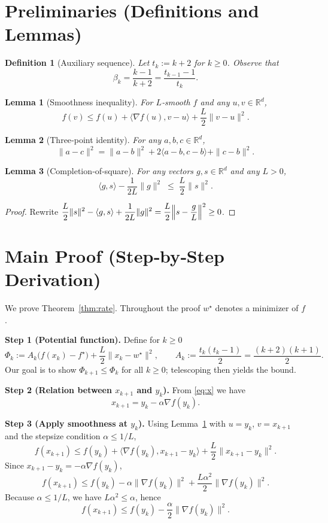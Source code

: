 \documentclass{article}
\newtheorem{lemma}{Lemma}
\newtheorem{definition}{Definition}
\newcommand{\grad}{\nabla}
\newcommand{\R}{\mathbb{R}}
\begin{document}
\section*{Preliminaries (Definitions and Lemmas)}
\begin{definition}[Auxiliary sequence]\label{def:tk}
Let $t_k:=k+2$ for $k\ge0$. Observe that
\[
\beta_k=\frac{k-1}{k+2}= \frac{t_{k-1}-1}{t_k}.
\tag{D1}
\]
\end{definition}
\begin{lemma}[Smoothness inequality]\label{lem:smooth}
For $L$‑smooth $f$ and any $u,v\in\R^d$,
\[
f(v)\le f(u)+\langle\grad f(u),v-u\rangle+\frac{L}{2}\|v-u\|^2 .
\tag{L1}
\]
\end{lemma}
\begin{lemma}[Three‑point identity]\label{lem:three}
For any $a,b,c\in\R^d$,
\[
\|a-c\|^2 = \|a-b\|^2 + 2\langle a-b,c-b\rangle + \|c-b\|^2 .
\tag{L2}
\]
\end{lemma}
\begin{lemma}[Completion‑of‑square]\label{lem:cs}
For any vectors $g,s\in\R^d$ and any $L>0$,
\[
\langle g,s\rangle-\frac{1}{2L}\|g\|^2\;\le\;\frac{L}{2}\|s\|^2 .
\tag{L3}
\]
\end{lemma}
\begin{proof}
Rewrite $\displaystyle\frac{L}{2}\|s\|^2-\langle g,s\rangle+\frac{1}{2L}\|g\|^2
=\frac{L}{2}\Bigl\|s-\frac{g}{L}\Bigr\|^2\ge0$.
\end{proof}

\section*{Main Proof (Step‑by‑Step Derivation)}
We prove Theorem~\ref{thm:rate}. Throughout the proof $w^\star$ denotes a minimizer of $f$.

\noindent\textbf{Step 1 (Potential function).}  
Define for $k\ge0$
\[
\Phi_k := A_k\bigl(f(x_k)-f^\star\bigr)+\frac{L}{2}\|x_k-w^\star\|^2 ,
\qquad
A_k:=\frac{t_k(t_k-1)}{2}= \frac{(k+2)(k+1)}{2}.
\tag{P1}
\]
Our goal is to show $\Phi_{k+1}\le \Phi_k$ for all $k\ge0$; telescoping then yields the bound.

\noindent\textbf{Step 2 (Relation between $x_{k+1}$ and $y_k$).}  
From \eqref{eq:x} we have
\[
x_{k+1}=y_k-\alpha\grad f(y_k).
\tag{S2}
\]

\noindent\textbf{Step 3 (Apply smoothness at $y_k$).}  
Using Lemma~\ref{lem:smooth} with $u=y_k$, $v=x_{k+1}$ and the stepsize condition $\alpha\le 1/L$,
\[
f(x_{k+1})\le f(y_k)+\langle\grad f(y_k),x_{k+1}-y_k\rangle+\frac{L}{2}\|x_{k+1}-y_k\|^2 .
\]
Since $x_{k+1}-y_k=-\alpha\grad f(y_k)$,
\[
f(x_{k+1})\le f(y_k)-\alpha\|\grad f(y_k)\|^2+\frac{L\alpha^{2}}{2}\|\grad f(y_k)\|^2 .
\tag{S3}
\]
Because $\alpha\le 1/L$, we have $L\alpha^{2}\le\alpha$, hence
\[
f(x_{k+1})\le f(y_k)-\frac{\alpha}{2}\|\grad f(y_k)\|^2 .
\tag{S3'}
\]
\end{document}
